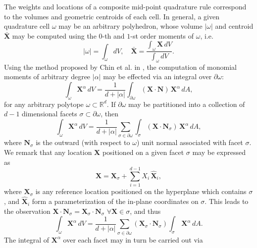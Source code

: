 	The weights and locations of a composite mid-point quadrature rule correspond to the volumes and geometric centroids of each cell. In general, a given quadrature cell $\omega$ may be an arbitrary polyhedron, whose volume $|\omega|$ and centroid $\bar{\mathbf{X}}$ may be computed using the $0$-th and $1$-st order moments of $\omega$, i.e.
	\begin{equation}
		|\omega| = \int_{\omega} dV, \quad \bar{\mathbf{X}} = \frac{\int_{\omega} \mathbf{X} \, dV}{\int_{\omega} dV}.
	\end{equation}
	Using the method proposed by Chin et al. in \cite{Chin:15}, the computation of monomial moments of arbitrary degree $|\alpha|$ may be effected via an integral over $\partial \omega$:
	\begin{equation}
		\int_{\omega} \mathbf{X}^\alpha \, dV = \frac{1}{d+|\alpha|} \int_{\partial \omega} (\mathbf{X} \cdot \mathbf{N}) \, \mathbf{X}^\alpha \, dA,
	\end{equation}
	for any arbitrary polytope $\omega \subset \mathbb{R}^d$. If $\partial \omega$ may be partitioned into a collection of $d-1$ dimensional facets $\sigma \subset \partial \omega$, then
	\begin{equation}
		\int_{\omega} \mathbf{X}^\alpha \, dV = \frac{1}{d+|\alpha|} \sum_{\sigma \in \partial \omega} \int_{\sigma} (\mathbf{X} \cdot \mathbf{N}_{\sigma}) \, \mathbf{X}^\alpha \, dA,
	\end{equation}
	where $\mathbf{N}_\sigma$ is the outward (with respect to $\omega$) unit normal associated with facet $\sigma$. We remark that any location $\mathbf{X}$ positioned on a given facet $\sigma$ may be expressed as
	\begin{equation}
		\mathbf{X} = \mathbf{X}_\sigma + \sum_{i=1}^{d-1} X_i \, \hat{\mathbf{X}}_i,
	\end{equation}
	where $\mathbf{X}_\sigma$ is any reference location positioned on the hyperplane which contains $\sigma$, and $\hat{\mathbf{X}}_i$ form a parameterization of the in-plane coordinates on $\sigma$. This leads to the observation $\mathbf{X} \cdot \mathbf{N}_\sigma = \mathbf{X}_\sigma \cdot \mathbf{N}_\sigma \, \, \forall \mathbf{X} \in \sigma$, and thus
	\begin{equation}
		\int_{\omega} \mathbf{X}^\alpha \, dV = \frac{1}{d+|\alpha|} \sum_{\sigma \in \partial \omega} (\mathbf{X}_\sigma \cdot \mathbf{N}_{\sigma}) \int_{\sigma} \, \mathbf{X}^\alpha \, dA.
	\end{equation}
	The integral of $\mathbf{X}^\alpha$ over each facet may in turn be carried out via
